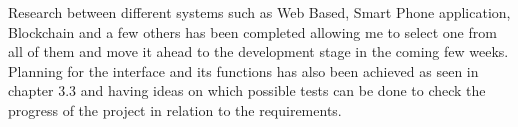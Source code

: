 \documentclass[../main.tex]{subfiles}
\begin{document}
\raggedright

Research between different systems such as Web Based, Smart Phone application, Blockchain and a few others has been completed allowing me to select one from all of them and move it ahead to the development stage in the coming few weeks. Planning for the interface and its functions has also been achieved as seen in chapter 3.3 and having ideas on which possible tests can be done to check the progress of the project in relation to the requirements. 
\end{document}
